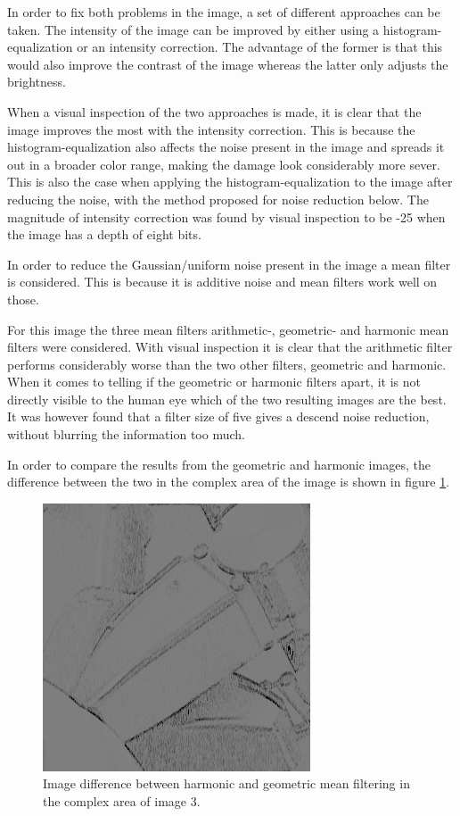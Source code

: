 In order to fix both problems in the image, a set of different approaches can be taken.
The intensity of the image can be improved by either using a histogram-equalization or an intensity correction.
The advantage of the former is that this would also improve the contrast of the image whereas the latter only adjusts the brightness.

When a visual inspection of the two approaches is made, it is clear that the image improves the most with the intensity correction.
This is because the histogram-equalization also affects the noise present in the image and spreads it out in a broader color range, making the damage look considerably more sever.
This is also the case when applying the histogram-equalization to the image after reducing the noise, with the method proposed for noise reduction below.
The magnitude of intensity correction was found by visual inspection to be -25 when the image has a depth of eight bits.


In order to reduce the Gaussian/uniform noise present in the image a mean filter is considered.
This is because it is additive noise and mean filters work well on those.

For this image the three mean filters arithmetic-, geometric- and harmonic mean filters were considered.
With visual inspection it is clear that the arithmetic filter performs considerably worse than the two other filters, geometric and harmonic.
When it comes to telling if the geometric or harmonic filters apart, it is not directly visible to the human eye which of the two resulting images are the best.
It was however found that a filter size of five gives a descend noise reduction, without blurring the information too much.

In order to compare the results from the geometric and harmonic images, the difference between the two in the complex area of the image is shown in figure \ref{fig:diff_harVSgeo_im03}.



\begin{figure}[H]
\centering
\includegraphics[width= \cutOutWidth]{../code/images/image_harVSgeo_complex_03}
\caption{Image difference between harmonic and geometric mean filtering in the complex area of image 3.}
\label{fig:diff_harVSgeo_im03}
\end{figure}


